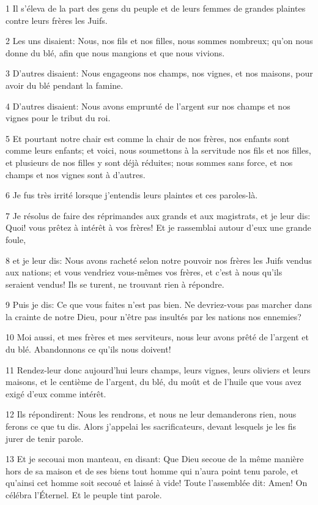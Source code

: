 \par 1 Il s'éleva de la part des gens du peuple et de leurs femmes de grandes plaintes contre leurs frères les Juifs.
\par 2 Les uns disaient: Nous, nos fils et nos filles, nous sommes nombreux; qu'on nous donne du blé, afin que nous mangions et que nous vivions.
\par 3 D'autres disaient: Nous engageons nos champs, nos vignes, et nos maisons, pour avoir du blé pendant la famine.
\par 4 D'autres disaient: Nous avons emprunté de l'argent sur nos champs et nos vignes pour le tribut du roi.
\par 5 Et pourtant notre chair est comme la chair de nos frères, nos enfants sont comme leurs enfants; et voici, nous soumettons à la servitude nos fils et nos filles, et plusieurs de nos filles y sont déjà réduites; nous sommes sans force, et nos champs et nos vignes sont à d'autres.
\par 6 Je fus très irrité lorsque j'entendis leurs plaintes et ces paroles-là.
\par 7 Je résolus de faire des réprimandes aux grands et aux magistrats, et je leur dis: Quoi! vous prêtez à intérêt à vos frères! Et je rassemblai autour d'eux une grande foule,
\par 8 et je leur dis: Nous avons racheté selon notre pouvoir nos frères les Juifs vendus aux nations; et vous vendriez vous-mêmes vos frères, et c'est à nous qu'ils seraient vendus! Ils se turent, ne trouvant rien à répondre.
\par 9 Puis je dis: Ce que vous faites n'est pas bien. Ne devriez-vous pas marcher dans la crainte de notre Dieu, pour n'être pas insultés par les nations nos ennemies?
\par 10 Moi aussi, et mes frères et mes serviteurs, nous leur avons prêté de l'argent et du blé. Abandonnons ce qu'ils nous doivent!
\par 11 Rendez-leur donc aujourd'hui leurs champs, leurs vignes, leurs oliviers et leurs maisons, et le centième de l'argent, du blé, du moût et de l'huile que vous avez exigé d'eux comme intérêt.
\par 12 Ils répondirent: Nous les rendrons, et nous ne leur demanderons rien, nous ferons ce que tu dis. Alors j'appelai les sacrificateurs, devant lesquels je les fis jurer de tenir parole.
\par 13 Et je secouai mon manteau, en disant: Que Dieu secoue de la même manière hors de sa maison et de ses biens tout homme qui n'aura point tenu parole, et qu'ainsi cet homme soit secoué et laissé à vide! Toute l'assemblée dit: Amen! On célébra l'Éternel. Et le peuple tint parole.
